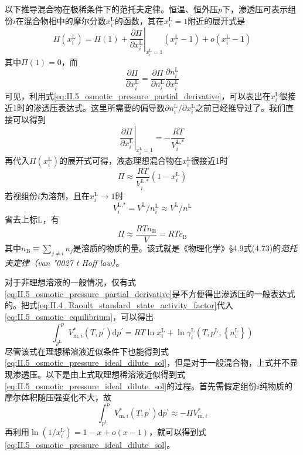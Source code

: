 \documentclass[main.tex]{subfiles}
\begin{document}
以下推导混合物在极稀条件下的范托夫定律。恒温、恒外压$p$下，渗透压可表示组份$i$在混合物相中的摩尔分数$x_i^\text{L}$的函数，其在$x_i^\text{L}=1$附近的展开式是
\[\Pi\left(x_i^\text{L}\right)=\Pi\left(1\right)+\left.\frac{\partial\Pi}{\partial x_i^\text{L}}\right|_{x_i^\text{L}=1}\left(x_i^\text{L}-1\right)+o\left(x_i^\text{L}-1\right)\]
其中$\Pi\left(1\right)=0$，而
\[\frac{\partial \Pi}{\partial x_i^\text{L}}=\frac{\partial\Pi}{\partial n_i^\text{L}}\frac{\partial n_i^\text{L}}{\partial x_i^\text{L}}\]
可见，利用式\eqref{eq:II.5_osmotic_pressure_partial_derivative}，可以表出在$x_i^\text{L}$很接近1时的渗透压表达式。这里所需要的偏导数$\partial n_i^\text{L}/\partial x_i^\text{L}$之前已经推导过了。我们直接可以得到
\[\left.\frac{\partial \Pi}{\partial x_i^\text{L}}\right|_{x_i^\text{L}=1}=-\frac{RT}{V_i^\text{L,*}}\]
再代入$\Pi\left(x_i^\text{L}\right)$的展开式可得，液态理想混合物在$x_i^\text{L}$很接近1时
\[\Pi\approx\frac{RT}{V_i^\text{L,*}}\left(1-x_i^\text{L}\right)\]
若视组份$i$为溶剂，且在$x_i^\text{L}\rightarrow 1$时
\[V_i^\text{L,*}=V^\text{L}/n_i^\text{L}\approx V^\text{L}/n^\text{L}\]
省去上标L，有
\begin{equation}\label{eq:II.5_osmotic_pressure_ideal_dilute_sol}\Pi \approx \frac{RTn_\text{B}}{V}=RTc_\text{B}\end{equation}
其中$n_\text{B}\equiv\sum_{j\neq i}n_j$是溶质的物质的量。该式就是《物理化学》\S4.9式(4.73)的\emph{范托夫定律（van \char"0027 t Hoff law）}。

对于非理想溶液的一般情况，仅有式\eqref{eq:II.5_osmotic_pressure_partial_derivative}是不方便得出渗透压的一般表达式的。把式\eqref{eq:II.4_Raoult_standard_state_activity_factor}代入\eqref{eq:II.5_osmotic_equilibrium}，可以得出
\begin{equation}\label{eq:II.5_osmotic_equilibrium_activity_factor}
  \int_{p^\text{L}}^p V_{\text{m},i}^*\left(T,p^\prime\right)\mathrm{d}p^\prime=RT\ln x_i^\text{L}+\ln \gamma_i^\text{L}\left(T,p^\text{L},\left\{n_i^\text{L}\right\}\right)
\end{equation}
尽管该式在理想稀溶液近似条件下也能得到式\eqref{eq:II.5_osmotic_pressure_ideal_dilute_sol}，但是对于一般混合物，上式并不显现渗透压。以下是由上式取理想稀溶液近似得到式\eqref{eq:II.5_osmotic_pressure_ideal_dilute_sol}的过程。首先需假定组份$i$纯物质的摩尔体积随压强变化不大，故
\[\int_{p^\text{L}}^pV_{\text{m},i}^*\left(T,p^\prime\right)\mathrm{d}p^\prime\approx-\Pi V_{\text{m},i}^*\]
再利用$\ln\left(1/x_i^\text{L}\right)=1-x+o\left(x-1\right)$，就可以得到式\eqref{eq:II.5_osmotic_pressure_ideal_dilute_sol}。
\end{document}
